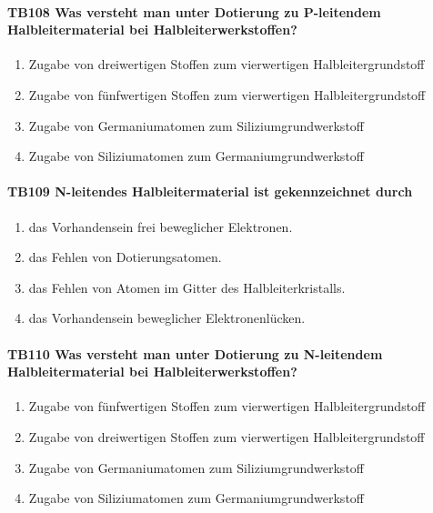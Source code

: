 \documentclass[8pt]{article}
\begin{document}
\begin{enumerate}
\paragraph*{TB108 Was versteht man unter Dotierung zu P-leitendem Halbleitermaterial bei Halbleiterwerkstoffen?}
\begin{enumerate}[nolistsep,label=\Alph*]
\item Zugabe von dreiwertigen Stoffen zum vierwertigen Halbleitergrundstoff 
\item Zugabe von fünfwertigen Stoffen zum vierwertigen Halbleitergrundstoff
\item Zugabe von Germaniumatomen zum Siliziumgrundwerkstoff
\item Zugabe von Siliziumatomen zum Germaniumgrundwerkstoff
\end{enumerate}



\paragraph*{TB109 N-leitendes Halbleitermaterial ist gekennzeichnet durch}
\begin{enumerate}[nolistsep,label=\Alph*]
\item das Vorhandensein frei beweglicher Elektronen.
\item das Fehlen von Dotierungsatomen.
\item das Fehlen von Atomen im Gitter des Halbleiterkristalls.
\item das Vorhandensein beweglicher Elektronenlücken.
\end{enumerate}



\paragraph*{TB110 Was versteht man unter Dotierung zu N-leitendem Halbleitermaterial bei Halbleiterwerkstoffen?}
\begin{enumerate}[nolistsep,label=\Alph*]
\item Zugabe von fünfwertigen Stoffen zum vierwertigen Halbleitergrundstoff
\item Zugabe von dreiwertigen Stoffen zum vierwertigen Halbleitergrundstoff
\item Zugabe von Germaniumatomen zum Siliziumgrundwerkstoff
\item Zugabe von Siliziumatomen zum Germaniumgrundwerkstoff
\end{enumerate}




\end{enumerate}
\end{document}
